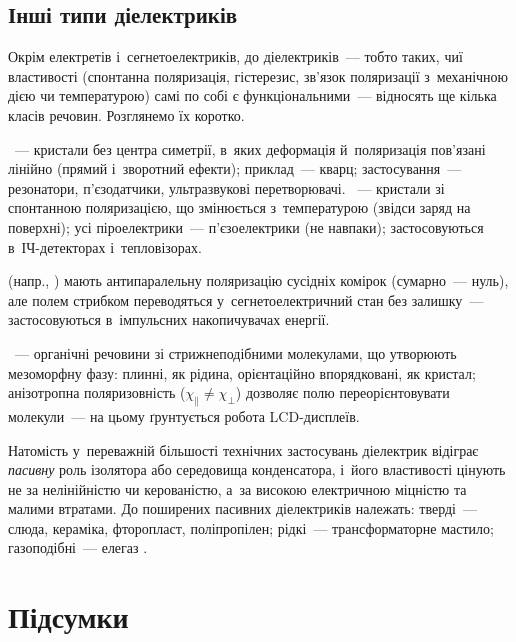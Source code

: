 \subsection*{Інші типи діелектриків}\label{sec:PiezoPyro}


Окрім електретів і~сегнетоелектриків, до  діелектриків~--- тобто таких,
чиї властивості (спонтанна поляризація, гістерезис, зв'язок поляризації з~механічною дією
чи температурою) самі по собі є функціональними~--- відносять ще кілька класів речовин.
Розглянемо їх коротко.

~--- кристали без центра симетрії, в~яких деформація й~поляризація
пов'язані лінійно (прямий і~зворотний ефекти); приклад~--- кварц; застосування~---
резонатори, п'єзодатчики, ультразвукові перетворювачі. ~--- кристали
зі спонтанною поляризацією, що змінюється з~температурою (звідси заряд на поверхні); усі
піроелектрики~--- п'єзоелектрики (не навпаки); застосовуються в~ІЧ-детекторах
і~тепловізорах.

 (напр., ) мають антипаралельну поляризацію
сусідніх комірок (сумарно~--- нуль), але полем стрибком переводяться у~сегнетоелектричний
стан без залишку~--- застосовуються в~імпульсних накопичувачах енергії.

~--- органічні речовини зі стрижнеподібними молекулами, що утворюють
мезоморфну фазу: плинні, як рідина, орієнтаційно впорядковані, як кристал; анізотропна
поляризовність ($\chi_\parallel\neq\chi_\perp$) дозволяє полю переорієнтовувати
молекули~--- на цьому ґрунтується робота LCD-дисплеїв.

Натомість у~переважній більшості технічних застосувань діелектрик відіграє \emph{пасивну}
роль ізолятора або середовища конденсатора, і~його властивості цінують не за нелінійністю
чи керованістю, а~за високою електричною міцністю та малими втратами. До поширених
пасивних діелектриків належать: тверді~--- слюда, кераміка, фторопласт, поліпропілен;
рідкі~--- трансформаторне мастило; газоподібні~--- елегаз .


\section*{Підсумки}

